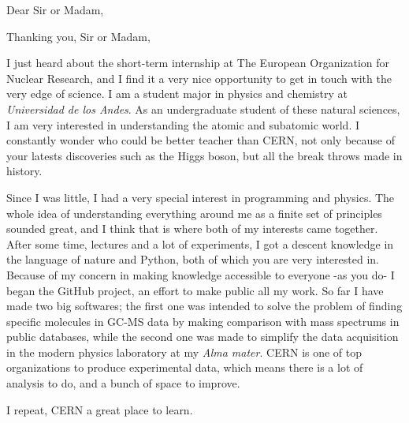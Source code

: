 \documentclass[11pt,letterpaper, sans]{moderncv}        %
\begin{document}
\date{October 25, 2016}
\opening{Dear Sir or Madam,}
\closing{Thanking you, Sir or Madam,}
\makelettertitle

I just heard about the short-term internship at The European Organization for Nuclear Research, and I find it a very nice opportunity to get in touch with the very edge of science. I am a student major in physics and chemistry at \textit{Universidad de los Andes}. As an undergraduate student of these natural sciences, I am very interested in understanding the atomic and subatomic world. I constantly wonder who could be better teacher than CERN, not only because of your latests discoveries such as the Higgs boson, but all the break throws made in history. 

Since I was little, I had a very special interest in programming and physics. The whole idea of understanding everything around me as a finite set of principles sounded great, and I think that is where both of my interests came together. After some time, lectures and a lot of experiments, I got a descent knowledge in the language of nature and Python, both of which you are very interested in. Because of my concern in making knowledge accessible to everyone -as you do- I began the GitHub project, an effort to make public all my work. So far I have made two big softwares; the first one was intended to solve the problem of finding specific molecules in GC-MS data by making comparison with mass spectrums in public databases, while the second one was made to simplify the data acquisition in the modern physics laboratory at my \textit{Alma mater}. CERN is one of top organizations to produce experimental data, which means there is a lot of analysis to do, and a bunch of space to improve.



I repeat, CERN a great place to learn.

\makeletterclosing
\end{document}
